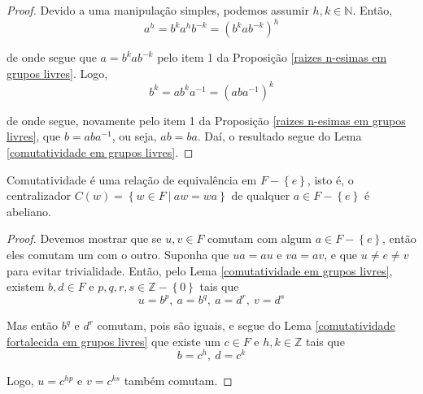     	\begin{proof}
    		Devido a uma manipulação simples, podemos assumir $h,k\in\mathbb{N}$. Então,
    		\begin{equation*}
    		    a^h = b^ka^hb^{-k} = (b^kab^{-k})^h
    		\end{equation*}
    		\par\vspace{0.3cm} de onde segue que $a = b^kab^{-k}$ pelo item 1 da 
    		Proposição \eqref{raizes n-esimas em grupos livres}. Logo,
    		\begin{equation*}
    		    b^k = ab^ka^{-1} = (aba^{-1})^k
    		\end{equation*}
    		\par\vspace{0.3cm} de onde segue, novamente pelo item 1 da 
    		Proposição \eqref{raizes n-esimas em grupos livres}, que $b = aba^{-1}$, ou seja, $ab = ba$. 
    		Daí, o resultado segue do Lema \eqref{comutatividade em grupos livres}.
    	\end{proof}
    	\begin{prop}
    	\label{comutatividade e relacao de equivalencia em grupos livres}
    		Comutatividade é uma relação de equivalência em $F - \left\{ e \right\}$, isto é, o 
    		centralizador $C(w) = \left\{ w\in F \ \vert \ aw = wa \right\}$ de qualquer 
    		$a\in F - \left\{e\right\}$ é abeliano.
    	\end{prop}
    	\begin{proof}
    		Devemos mostrar que se $u,v\in F$ comutam com algum $a\in F - \left\{ e \right\}$, então 
    		eles comutam um com o outro. Suponha que $ua=au$ e $va = av$, e que $u\neq e\neq v$ para evitar
    		trivialidade. Então, pelo Lema \eqref{comutatividade em grupos livres}, existem $b,d\in F$ e
    		$p,q,r,s\in\mathbb{Z} - \left\{0\right\}$ tais que 
    		\begin{equation*}
    		    u = b^p, \ a = b^q, \ a = d^r, \ v = d^s
    		\end{equation*}
    		\par\vspace{0.3cm} Mas então $b^q$ e $d^r$ comutam, pois são iguais, e segue do 
    		Lema \eqref{comutatividade fortalecida em grupos livres} que existe um $c\in F$ e 
    		$h,k\in\mathbb{Z}$ tais que
    		\begin{equation*}
    		    b = c^h, \ d = c^k
    		\end{equation*}
    		\par\vspace{0.3cm} Logo, $u = c^{hp}$ e $v = c^{ks}$ também comutam.
    	\end{proof}
